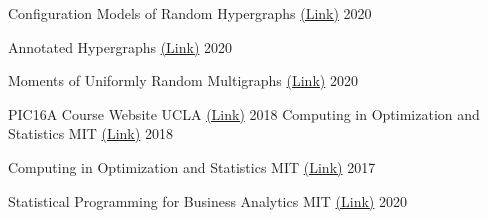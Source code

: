 


\begin{cvhonors}
    \cvhonor
        {Configuration Models of Random Hypergraphs}
        {} %
        {\href{https://github.com/PhilChodrow/hypergraph}{(Link)}} %
        {2020} %

    \cvhonor
        {Annotated Hypergraphs} 
        {} %
        {\href{https://github.com/PhilChodrow/annotated_hypergraphs}{(Link)}} %
        {2020} %

    \cvhonor
        {Moments of Uniformly Random Multigraphs} %
        {} %
        {\href{https://github.com/PhilChodrow/multigraph_moments}{(Link)}} %
        {2020} %
\end{cvhonors}


\begin{cvhonors}
    \cvhonor
    {PIC16A Course Website}
    {UCLA}
    {\href{https://philchodrow.github.io/PIC16A/}{(Link)}}
    {2018}
    \cvhonor
        {Computing in Optimization and Statistics}
        {MIT} %
        {\href{https://philchodrow.github.io/cos_2018/}{(Link)}} %
        {2018} %

    \cvhonor
        {Computing in Optimization and Statistics}
        {MIT} %
        {\href{https://philchodrow.github.io/cos_2017/}{(Link)}} %
        {2017} %
    
    \cvhonor
        {Statistical Programming for Business Analytics}
        {MIT} %
        {\href{https://philchodrow.github.io/mban_orientation/}{(Link)}} %
        {2020} %
\end{cvhonors}
